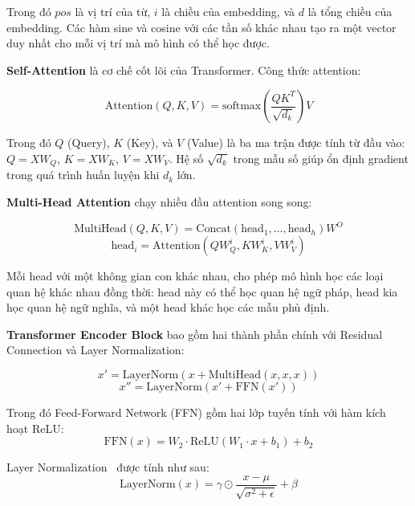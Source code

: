 \documentclass[../BTL.tex]{subfiles}
\begin{document}
Trong đó $pos$ là vị trí của từ, $i$ là chiều của embedding, và $d$ là tổng chiều của embedding. Các hàm sine và cosine với các tần số khác nhau tạo ra một vector duy nhất cho mỗi vị trí mà mô hình có thể học được.

\textbf{Self-Attention} là cơ chế cốt lõi của Transformer. Công thức attention:

\begin{equation}
    \text{Attention}(Q, K, V) = \text{softmax}\left(\frac{QK^T}{\sqrt{d_k}}\right)V
\end{equation}

Trong đó $Q$ (Query), $K$ (Key), và $V$ (Value) là ba ma trận được tính từ đầu vào: $Q = XW_Q$, $K = XW_K$, $V = XW_V$. Hệ số $\sqrt{d_k}$ trong mẫu số giúp ổn định gradient trong quá trình huấn luyện khi $d_k$ lớn.

\textbf{Multi-Head Attention} chạy nhiều đầu attention song song:

\begin{equation}
    \text{MultiHead}(Q, K, V) = \text{Concat}(\text{head}_1, \ldots, \text{head}_h)W^O
\end{equation}
\begin{equation}
    \text{head}_i = \text{Attention}(QW_Q^i, KW_K^i, VW_V^i)
\end{equation}

Mỗi head với một không gian con khác nhau, cho phép mô hình học các loại quan hệ khác nhau đồng thời: head này có thể học quan hệ ngữ pháp, head kia học quan hệ ngữ nghĩa, và một head khác học các mẫu phủ định.

\textbf{Transformer Encoder Block} bao gồm hai thành phần chính với Residual Connection và Layer Normalization:

\begin{equation}
    x' = \text{LayerNorm}(x + \text{MultiHead}(x, x, x))
\end{equation}
\begin{equation}
    x'' = \text{LayerNorm}(x' + \text{FFN}(x'))
\end{equation}

Trong đó Feed-Forward Network (FFN) gồm hai lớp tuyến tính với hàm kích hoạt ReLU:
\begin{equation}
    \text{FFN}(x) = W_2 \cdot \text{ReLU}(W_1 \cdot x + b_1) + b_2
\end{equation}

Layer Normalization~\cite{ba2016layer} được tính như sau:
\begin{equation}
    \text{LayerNorm}(x) = \gamma \odot \frac{x - \mu}{\sqrt{\sigma^2 + \epsilon}} + \beta
\end{equation}
\end{document}
